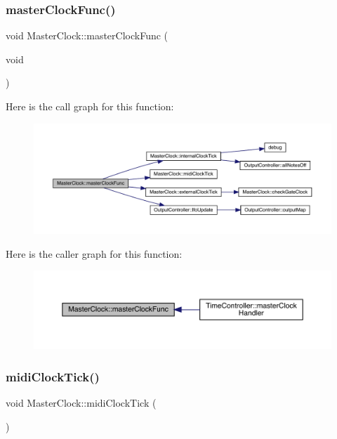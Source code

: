 \subsubsection{\texorpdfstring{master\+Clock\+Func()}{masterClockFunc()}}
{\footnotesize\ttfamily void Master\+Clock\+::master\+Clock\+Func (\begin{DoxyParamCaption}\item[{void}]{ }\end{DoxyParamCaption})}

Here is the call graph for this function\+:
\nopagebreak
\begin{figure}[H]
\begin{center}
\leavevmode
\includegraphics[width=350pt]{class_master_clock_a6d2a014da8caf9c4f39917ce4c09b83d_cgraph}
\end{center}
\end{figure}
Here is the caller graph for this function\+:
\nopagebreak
\begin{figure}[H]
\begin{center}
\leavevmode
\includegraphics[width=350pt]{class_master_clock_a6d2a014da8caf9c4f39917ce4c09b83d_icgraph}
\end{center}
\end{figure}
\mbox{\label{class_master_clock_a9c19932a580f5c5797fd31a58dc1a410}} 
\subsubsection{\texorpdfstring{midi\+Clock\+Tick()}{midiClockTick()}}
{\footnotesize\ttfamily void Master\+Clock\+::midi\+Clock\+Tick (\begin{DoxyParamCaption}{ }\end{DoxyParamCaption})}

